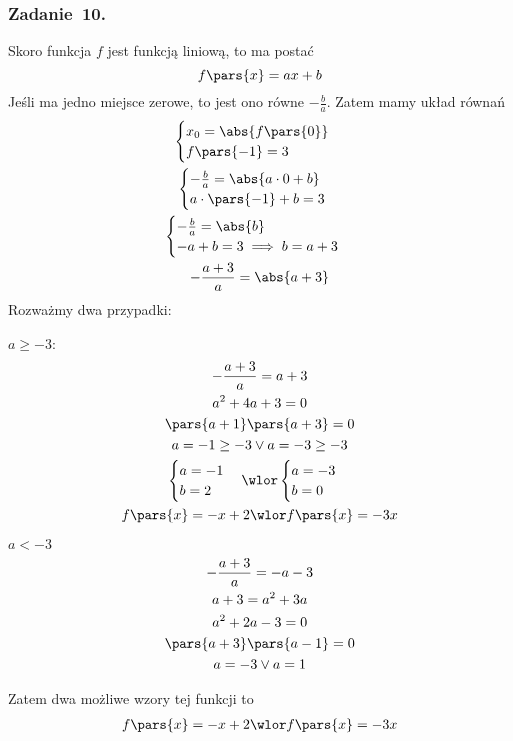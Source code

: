 \subsubsection*{Zadanie~10.}
Skoro funkcja \(f\) jest funkcją liniową, to ma postać
\begin{equation*}
    f\pars{x} = ax + b
\end{equation*}
Jeśli ma jedno miejsce zerowe, to jest ono równe \(-\frac{b}{a}\). Zatem mamy układ równań
\begin{gather*}
    \begin{cases}
        x_0 = \abs{f\pars{0}}\\
        f\pars{-1} = 3
    \end{cases}\\
    \begin{cases}
        -\frac{b}{a} = \abs{a \cdot 0 + b}\\
        a \cdot \pars{-1} + b = 3
    \end{cases}\\
    \begin{cases}
        -\frac{b}{a} = \abs{b}\\
        -a + b = 3 \implies b = a + 3
    \end{cases}\\
    -\frac{a + 3}{a} = \abs{a + 3}
\end{gather*}
Rozważmy dwa przypadki:
\begin{proofcases}
    \item \(a \geq -3\):
        \begin{gather*}
            -\frac{a + 3}{a} = a + 3\\
            a^2 + 4a + 3 = 0\\
            \pars{a + 1}\pars{a + 3} = 0\\
            a = -1 \geq -3 \lor a = -3 \geq -3\\
            \begin{cases}
                a = -1\\
                b = 2
            \end{cases}
            \wlor
            \begin{cases}
                a = -3\\
                b = 0
            \end{cases}\\
            f\pars{x} = -x + 2 \wlor f\pars{x} = -3x
        \end{gather*}
    \item \(a < -3\)
        \begin{gather*}
            -\frac{a + 3}{a} = -a - 3\\
            a + 3 = a^2 + 3a\\
            a^2 + 2a - 3 = 0\\
            \pars{a + 3}\pars{a - 1} = 0\\
            a = -3 \lor a = 1
        \end{gather*}
\end{proofcases}
Zatem dwa możliwe wzory tej funkcji to
\begin{gather*}
    f\pars{x} = -x + 2 \wlor f\pars{x} = -3x
\end{gather*}
